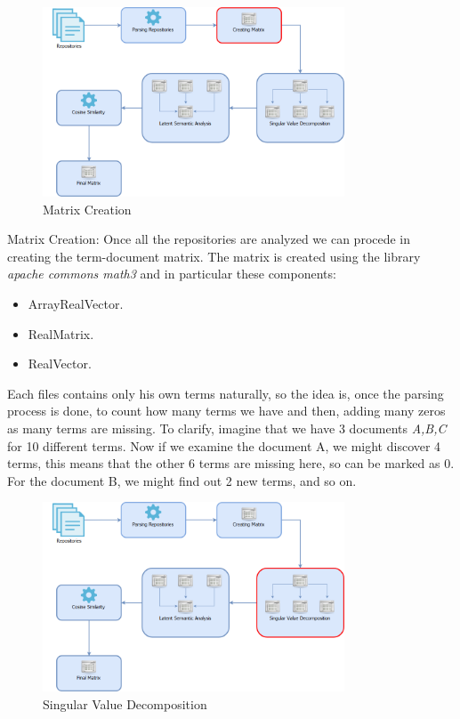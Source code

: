 \begin{figure}[!h]
	\centering
	\includegraphics[width=0.8\textwidth]{images/Architecture2.png}
	\caption{Matrix Creation}
\end{figure}


Matrix Creation: Once all the repositories are analyzed we can procede in creating the term-document matrix. The matrix is created using the library \emph{apache commons math3} and in particular these components:
\begin{itemize}
\item ArrayRealVector.
\item RealMatrix.
\item RealVector.
\end{itemize}
Each files contains only his own terms naturally, so the idea is, once the parsing process is done, to count how many terms we have and then, adding many zeros as many terms are missing. To clarify, imagine that we have 3 documents \emph{A,B,C} for 10 different terms.
Now if we examine the document A, we might discover 4 terms, this means that the other 6 terms are missing here, so can be marked as 0. 
For the document B, we might find out 2 new terms, and so on.


\begin{figure}[!h]
	\centering
	\includegraphics[width=0.8\textwidth]{images/Architecture3.png}
	\caption{Singular Value Decomposition}
\end{figure}

